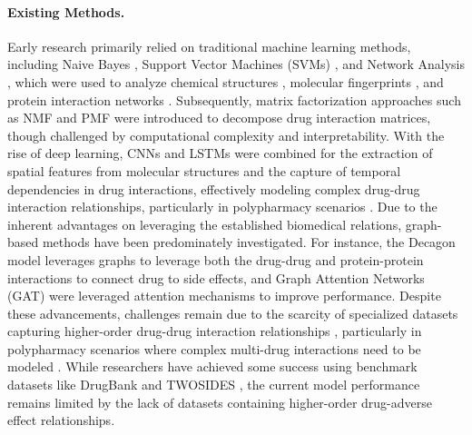 \paragraph{Existing Methods.} 
Early research primarily relied on traditional machine learning methods, including Naive Bayes \cite{jansen2003bayesian, burger2008accurate}, Support Vector Machines (SVMs) \cite{ferdousi2017computational}, and Network Analysis \cite{ye2014construction}, which were used to analyze chemical structures \cite{staszak2022machine}, molecular fingerprints \cite{rogers2010extended}, and protein interaction networks \cite{chowdhary2009bayesian, bradford2006insights}. Subsequently, matrix factorization approaches such as NMF \cite{lee1999learning} and PMF \cite{jain2023graph} were introduced to decompose drug interaction matrices, though challenged by computational complexity and interpretability. With the rise of deep learning, CNNs and LSTMs were combined for the extraction of spatial features from molecular structures and the capture of temporal dependencies in drug interactions, effectively modeling complex drug-drug interaction relationships, particularly in polypharmacy scenarios \cite{xu2018leveraging, karim2019drug, wen2023multimodal, peng2024effective}. Due to the inherent advantages on leveraging the established biomedical relations, graph-based methods have been predominately investigated. For instance, the Decagon model \cite{zitnik2018modeling} leverages graphs to leverage both the drug-drug and protein-protein interactions to connect drug to side effects, and Graph Attention Networks (GAT) \cite{mohamedtrivec} were leveraged attention mechanisms to improve performance. Despite these advancements, challenges remain due to the scarcity of specialized datasets capturing higher-order drug-drug interaction relationships \cite{lukavcivsin2019emergent}, particularly in polypharmacy scenarios where complex multi-drug interactions need to be modeled \cite{fatima2022comprehensive}. While researchers have achieved some success using benchmark datasets like DrugBank \cite{wishart2018drugbank} and TWOSIDES \cite{tatonetti2012data, zhang2023emerging}, the current model performance remains limited by the lack of datasets containing higher-order drug-adverse effect relationships.



